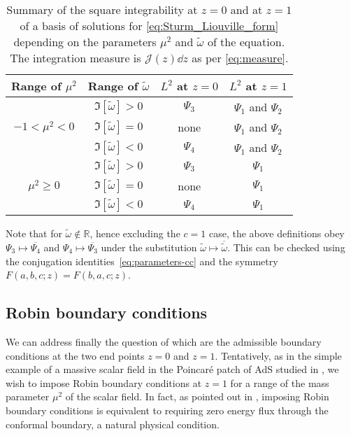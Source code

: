 \documentclass[aps, prd, amsmath, floats, floatfix, twocolumn, nofootinbib, superscriptaddress, showpacs]{revtex4-1}
\def\bR{{\mathbb R}}
\def\tomega{{\tilde{\omega}}}
\begin{document}
%
%
\setlength{\tabcolsep}{2ex}           %
\renewcommand{\arraystretch}{1.25}    %
\begin{center}
	\begin{table*}[t]
		\begin{tabular}{cccc}
		\hline\hline
		Range of $\mu^2$ & Range of $\tilde{\omega}$ & $L^2$ at $z=0$ & $L^2$ at $z=1$ \\
		\hline
		& $\Im[\tilde{\omega}] > 0$ & $\Psi_3$ & $\Psi_1$ and $\Psi_2$ \\
		$-1<\mu^2<0$ & $\Im[\tilde{\omega}] = 0$ & none & $\Psi_1$ and $\Psi_2$ \\
		& $\Im[\tilde{\omega}] < 0$ & $\Psi_4$ & $\Psi_1$ and $\Psi_2$ \\
		\hline
		& $\Im[\tilde{\omega}] > 0$ & $\Psi_3$ & $\Psi_1$ \\
		$\mu^2 \geqslant 0$ & $\Im[\tilde{\omega}] = 0$ & none & $\Psi_1$ \\
		& $\Im[\tilde{\omega}] < 0$ & $\Psi_4$ & $\Psi_1$ \\
		\hline\hline
		\end{tabular}
		\caption{Summary of the square integrability at $z=0$ and at $z=1$ of a basis of solutions for \eqref{eq:Sturm_Liouville_form} depending on the parameters $\mu^2$ and $\tilde{\omega}$ of the equation. The integration measure is $\mathcal{J}(z)\dd z$ as per \eqref{eq:measure}. \label{tab:BCsummary}}
	\end{table*}
\end{center}

\vspace*{-5.95ex}
Note that for $\tomega \not\in \bR$, hence excluding the $c=1$ case, the above definitions obey $\Psi_3 \mapsto
\overline{\Psi_4}$ and $\Psi_4 \mapsto \overline{\Psi_3}$ under the substitution $\tomega \mapsto \overline{\tomega}$. This can be checked using the conjugation identities~\eqref{eq:parameters-cc} and the symmetry $F(a,b,c;z) = F(b,a,c;z)$.

	
\subsection{Robin boundary conditions}
		
We can address finally the question of which are the admissible boundary conditions at the two end points $z=0$ and $z=1$. Tentatively, as in the simple example of a massive scalar field in the Poincar\'e patch of AdS studied in \cite{Dappiaggi:2016fwc}, we wish to impose Robin boundary conditions at $z=1$ for a range of the mass parameter $\mu^2$ of the scalar field. In fact, as pointed out in \cite{Ferreira:2017}, imposing Robin boundary conditions is equivalent to requiring zero energy flux through the conformal boundary, a natural physical condition.
\end{document}

